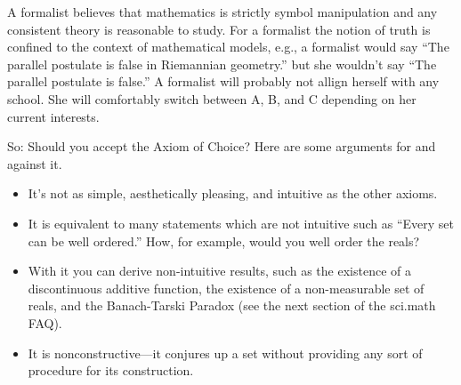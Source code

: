 A formalist believes that mathematics is strictly symbol manipulation and any
consistent theory is reasonable to study.  For a formalist the notion of truth
is confined to the context of mathematical models, e.g., a formalist would say
``The parallel postulate is false in Riemannian geometry.'' but she wouldn't say
``The parallel postulate is false.''  A formalist will probably not allign
herself with any school.  She will comfortably switch between A, B, and C
depending on her current interests.


So: Should you accept the Axiom of Choice?  Here are some arguments
for and against it.

\medskip
{}

\begin{itemize}
\item It's not as simple, aesthetically pleasing, and intuitive as the other
  axioms.
\item It is equivalent to many statements which are not intuitive such as ``Every
  set can be well ordered.''  How, for example, would you well order the reals?
\item With it you can derive non-intuitive results, such as the existence of a
  discontinuous additive function, the existence of a non-measurable set of
  reals, and the Banach-Tarski Paradox (see the next section of the sci.math
  FAQ).
\item It is nonconstructive---it conjures up a set without providing any sort of
  procedure for its construction.
\end{itemize}

\smallskip

